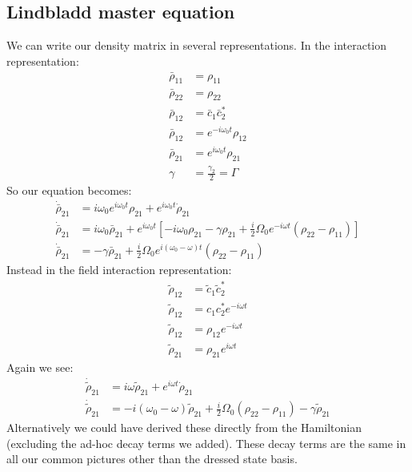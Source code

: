 \subsection{Lindbladd master equation}
We can write our density matrix in several representations. In the interaction representation:
\begin{align*}
	\bar{\rho}_{11} &= \rho_{11} \\
	\bar{\rho}_{22} &= \rho_{22} \\
	\bar{\rho}_{12} &= \bar{c}_1\bar{c}_2^* \\
	\bar{\rho}_{12} &= e^{-i\omega_0 t}\rho_{12} \\
	\bar{\rho}_{21} &= e^{i\omega_0 t}\rho_{21} \\
	\gamma &= \frac{\gamma_2}{2} = \Gamma
\end{align*}
So our equation becomes:
\begin{align*}
	\dot{\bar{\rho}}_{21} &= i\omega_0 e^{i\omega_0 t}\rho_{21} + e^{i\omega_0 t} \dot{\rho}_{21} \\
	\dot{\bar{\rho}}_{21} &= i\omega_0 \bar{\rho}_{21} + e^{i\omega_0 t} \left[-i\omega_0\rho_{21} - \gamma\rho_{21} + \frac{i}{2} \Omega_0 e^{-i\omega t}(\rho_{22} - \rho_{11})\right] \\
	\dot{\bar{\rho}}_{21} &= -\gamma\bar{\rho}_{21} + \frac{i}{2}\Omega_0 e^{i(\omega_0-\omega)t}(\rho_{22}-\rho_{11})
\end{align*}
Instead in the field interaction representation:
\begin{align*}
	\tilde{\rho}_{12} &= \tilde{c}_1\tilde{c}_2^* \\
	\tilde{\rho}_{12} &= c_1c_2^* e^{-i\omega t} \\
	\tilde{\rho}_{12} &= \rho_{12} e^{-i\omega t} \\
	\tilde{\rho}_{21} &= \rho_{21} e^{i\omega t}
\end{align*}
Again we see:
\begin{align*}
	\dot{\tilde{\rho}}_{21} &= i\omega\tilde{\rho}_{21} + e^{i\omega t} \dot{\rho}_{21} \\
	\dot{\tilde{\rho}}_{21} &= -i(\omega_0-\omega)\tilde{\rho}_{21} + \frac{i}{2} \Omega_0 (\rho_{22} - \rho_{11}) -\gamma\tilde{\rho}_{21}
\end{align*}
Alternatively we could have derived these directly from the Hamiltonian (excluding the ad-hoc decay terms we added). These decay terms are the same in all our common pictures other than the dressed state basis.

